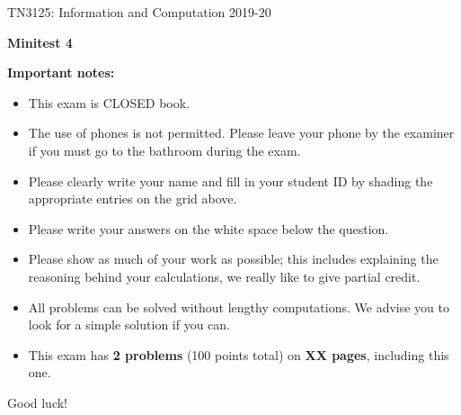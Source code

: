 \documentclass[11pt,a4paper,twoside]{article}
\begin{document}
\vspace*{-3cm}
TN3125: Information and Computation 2019-20 \\

\vspace{8cm}

\noindent \begin{center}
\textbf{{\Large Minitest 4}}\\
\par\end{center}

\vspace*{1cm}

\noindent \textbf{Important notes:}

\begin{itemize}
\item This exam is CLOSED book.
\item The use of phones is not permitted. Please leave your phone by the examiner if you must go to the bathroom during the exam.
\item Please clearly write your name and fill in your student ID by shading the appropriate entries on the grid above.
\item Please write your answers on the white space below the question. 
\item Please show as much of your work as possible; this includes explaining the reasoning behind your calculations, we really like to give partial credit.
\item All problems can be solved without lengthy computations. We advise you to look for a simple solution if you can.
\item This exam has {\bf 2 problems} (100 points total) on {\bf XX pages}, including this one.
\end{itemize}
\vspace{2cm}
Good luck!

\newpage

\newpage

\end{document}
